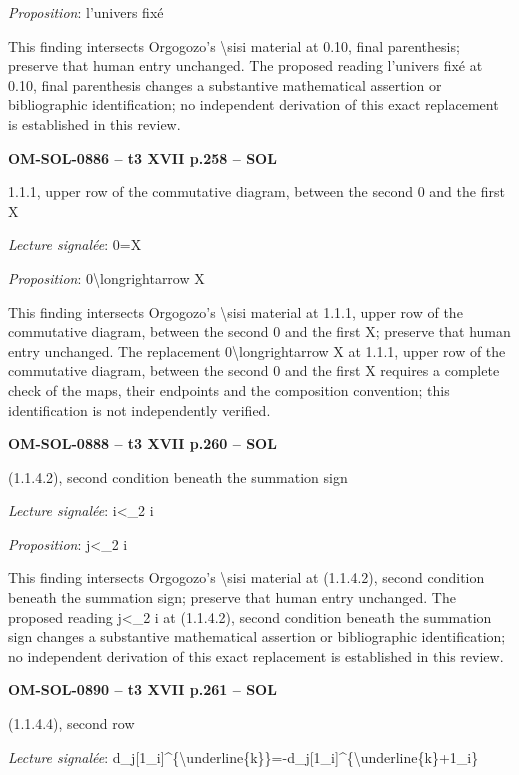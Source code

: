 \emph{Proposition}: l'univers fixé\par
This finding intersects Orgogozo's \textbackslash{}sisi material at 0.10, final parenthesis; preserve that human entry unchanged. The proposed reading l'univers fixé at 0.10, final parenthesis changes a substantive mathematical assertion or bibliographic identification; no independent derivation of this exact replacement is established in this review.\par
\par\noindent\textbf{OM-SOL-0886 -- t3 XVII p.258 -- SOL}\par
1.1.1, upper row of the commutative diagram, between the second 0 and the first X\par
\emph{Lecture signalée}: 0=\allowbreak X\par
\emph{Proposition}: 0\textbackslash{}longrightarrow X\par
This finding intersects Orgogozo's \textbackslash{}sisi material at 1.1.1, upper row of the commutative diagram, between the second 0 and the first X; preserve that human entry unchanged. The replacement 0\textbackslash{}longrightarrow X at 1.1.1, upper row of the commutative diagram, between the second 0 and the first X requires a complete check of the maps, their endpoints and the composition convention; this identification is not independently verified.\par
\par\noindent\textbf{OM-SOL-0888 -- t3 XVII p.260 -- SOL}\par
(1.1.4.2), second condition beneath the summation sign\par
\emph{Lecture signalée}: i<\_2 i\par
\emph{Proposition}: j<\_2 i\par
This finding intersects Orgogozo's \textbackslash{}sisi material at (1.1.4.2), second condition beneath the summation sign; preserve that human entry unchanged. The proposed reading j<\_2 i at (1.1.4.2), second condition beneath the summation sign changes a substantive mathematical assertion or bibliographic identification; no independent derivation of this exact replacement is established in this review.\par
\par\noindent\textbf{OM-SOL-0890 -- t3 XVII p.261 -- SOL}\par
(1.1.4.4), second row\par
\emph{Lecture signalée}: d\_j[1\_i]\textasciicircum{}\{\textbackslash{}underline\{k\}\}=\allowbreak -d\_j[1\_i]\textasciicircum{}\{\textbackslash{}underline\{k\}+1\_i\}\par
